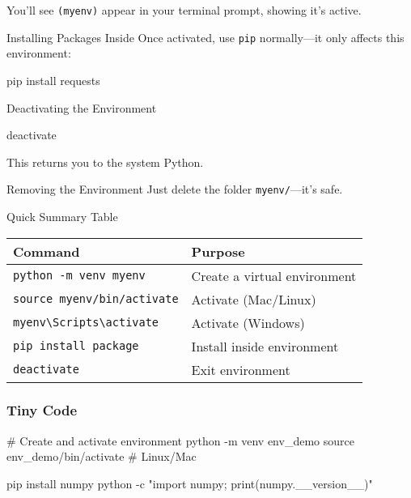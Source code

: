 \documentclass[
  letterpaper,
  DIV=11,
  numbers=noendperiod]{scrreprt}
\newenvironment{Shaded}{\begin{snugshade}}{\end{snugshade}}
\newcommand{\AttributeTok}[1]{\textcolor[rgb]{0.40,0.45,0.13}{#1}}
\newcommand{\BuiltInTok}[1]{\textcolor[rgb]{0.00,0.23,0.31}{#1}}
\newcommand{\CommentTok}[1]{\textcolor[rgb]{0.37,0.37,0.37}{#1}}
\newcommand{\ExtensionTok}[1]{\textcolor[rgb]{0.00,0.23,0.31}{#1}}
\newcommand{\NormalTok}[1]{\textcolor[rgb]{0.00,0.23,0.31}{#1}}
\newcommand{\StringTok}[1]{\textcolor[rgb]{0.13,0.47,0.30}{#1}}
\begin{document}
You'll see \texttt{(myenv)} appear in your terminal prompt, showing it's
active.

Installing Packages Inside Once activated, use \texttt{pip}
normally---it only affects this environment:

\begin{Shaded}
\begin{Highlighting}[]
\ExtensionTok{pip}\NormalTok{ install requests}
\end{Highlighting}
\end{Shaded}

Deactivating the Environment

\begin{Shaded}
\begin{Highlighting}[]
\ExtensionTok{deactivate}
\end{Highlighting}
\end{Shaded}

This returns you to the system Python.

Removing the Environment Just delete the folder \texttt{myenv/}---it's
safe.

Quick Summary Table

\begin{longtable}[]{@{}ll@{}}
\toprule\noalign{}
Command & Purpose \\
\midrule\noalign{}
\endhead
\bottomrule\noalign{}
\endlastfoot
\texttt{python\ -m\ venv\ myenv} & Create a virtual environment \\
\texttt{source\ myenv/bin/activate} & Activate (Mac/Linux) \\
\texttt{myenv\textbackslash{}Scripts\textbackslash{}activate} & Activate
(Windows) \\
\texttt{pip\ install\ package} & Install inside environment \\
\texttt{deactivate} & Exit environment \\
\end{longtable}

\subsubsection{Tiny Code}\label{tiny-code-48}

\begin{Shaded}
\begin{Highlighting}[]
\CommentTok{\# Create and activate environment}
\ExtensionTok{python} \AttributeTok{{-}m}\NormalTok{ venv env\_demo}
\BuiltInTok{source}\NormalTok{ env\_demo/bin/activate   }\CommentTok{\# Linux/Mac}

\ExtensionTok{pip}\NormalTok{ install numpy}
\ExtensionTok{python} \AttributeTok{{-}c} \StringTok{"import numpy; print(numpy.\_\_version\_\_)"}
\end{Highlighting}
\end{Shaded}
\end{document}
